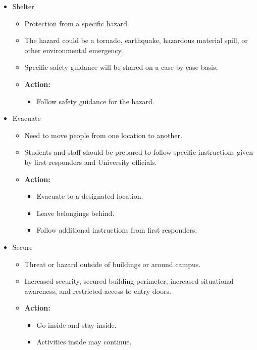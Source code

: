 \documentclass[12pt,letterpaper]{article}
\begin{document}
\begin{itemize}
  \item Shelter
    \begin{itemize}
      \item Protection from a specific hazard.
      \item The hazard could be a tornado, earthquake, hazardous
        material spill, or other environmental emergency.
      \item Specific safety guidance will be shared on a case-by-case basis.
      \item \textbf{Action:}
        \begin{itemize}
          \item Follow safety guidance for the hazard.
        \end{itemize}
    \end{itemize}
  \item Evacuate
    \begin{itemize}
      \item Need to move people from one location to another.
      \item Students and staff should be prepared to follow specific
        instructions given by first responders and University officials.
      \item \textbf{Action:}
        \begin{itemize}
          \item Evacuate to a designated location.
          \item Leave belongings behind.
          \item Follow additional instructions from first responders.
        \end{itemize}
    \end{itemize}
  \item Secure
    \begin{itemize}
      \item Threat or hazard outside of buildings or around campus.
      \item Increased security, secured building perimeter, increased
        situational awareness, and restricted access to entry doors.
      \item \textbf{Action:}
        \begin{itemize}
          \item Go inside and stay inside.
          \item Activities inside may continue.
        \end{itemize}
    \end{itemize}

\end{itemize}
\end{document}

